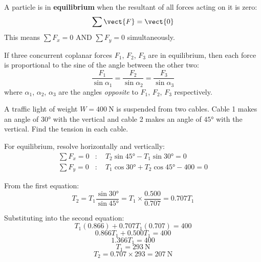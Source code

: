 \begin{definitionbox}[Equilibrium]
A particle is in \textbf{equilibrium} when the resultant
of all forces acting on it is zero:
\[
  \sum \vect{F} = \vect{0}
\]
This means $\sum F_x = 0$ AND $\sum F_y = 0$
simultaneously.
\end{definitionbox}

\begin{lawbox}
If three concurrent coplanar forces $F_1$, $F_2$, $F_3$
are in equilibrium, then each force is proportional to
the sine of the angle between the other two:
\[
  \frac{F_1}{\sin\alpha_1}
  = \frac{F_2}{\sin\alpha_2}
  = \frac{F_3}{\sin\alpha_3}
\]
where $\alpha_1$, $\alpha_2$, $\alpha_3$ are the angles
\textit{opposite} to $F_1$, $F_2$, $F_3$ respectively.
\end{lawbox}

\begin{examplebox}[2.12]
A traffic light of weight $W = 400\ \text{N}$ is
suspended from two cables. Cable 1 makes an angle of
$30°$ with the vertical and cable 2 makes an angle of
$45°$ with the vertical. Find the tension in each cable.
\end{examplebox}

\begin{solutionbox}
\begin{center}
\end{center}

For equilibrium, resolve horizontally and vertically:
\begin{align*}
  \sum F_x = 0&:\quad
  T_2\sin 45° - T_1\sin 30° = 0\\
  \sum F_y = 0&:\quad
  T_1\cos 30° + T_2\cos 45° - 400 = 0
\end{align*}

From the first equation:
\[
  T_2 = T_1 \frac{\sin 30°}{\sin 45°}
  = T_1 \times \frac{0.500}{0.707} = 0.707 T_1
\]

Substituting into the second equation:
\[
  T_1(0.866) + 0.707 T_1(0.707) = 400
\]
\[
  0.866 T_1 + 0.500 T_1 = 400
\]
\[
  1.366 T_1 = 400
\]
\[
  \boxed{T_1 = 293\ \text{N}}
\]
\[
  \boxed{T_2 = 0.707 \times 293 = 207\ \text{N}}
\]
\end{solutionbox}

